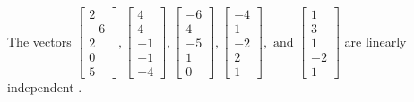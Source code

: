 \begin{exercise}
\begin{exerciseStatement}
  \end{exerciseStatement}
  \begin{exerciseAnswer}
   The vectors \(\left[\begin{array}{r}
2 \\
-6 \\
2 \\
0 \\
5
\end{array}\right] , \left[\begin{array}{r}
4 \\
4 \\
-1 \\
-1 \\
-4
\end{array}\right] , \left[\begin{array}{r}
-6 \\
4 \\
-5 \\
1 \\
0
\end{array}\right] , \left[\begin{array}{r}
-4 \\
1 \\
-2 \\
2 \\
1
\end{array}\right] , \text{ and } \left[\begin{array}{r}
1 \\
3 \\
1 \\
-2 \\
1
\end{array}\right]\) are 
  	 linearly independent  .
  


  \end{exerciseAnswer}
\end{exercise}